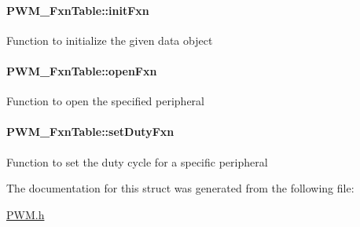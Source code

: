 \paragraph[{init\+Fxn}]{ P\+W\+M\+\_\+\+Fxn\+Table\+::init\+Fxn}\label{struct_p_w_m___fxn_table_aebcde91c512c962f100d13f511789254}
Function to initialize the given data object 
\paragraph[{open\+Fxn}]{ P\+W\+M\+\_\+\+Fxn\+Table\+::open\+Fxn}\label{struct_p_w_m___fxn_table_aca1bd99df949b2e0121ff90598279441}
Function to open the specified peripheral 
\paragraph[{set\+Duty\+Fxn}]{ P\+W\+M\+\_\+\+Fxn\+Table\+::set\+Duty\+Fxn}\label{struct_p_w_m___fxn_table_a766700e0a02097f9fd2d332b71082605}
Function to set the duty cycle for a specific peripheral 

The documentation for this struct was generated from the following file\+:\begin{DoxyCompactItemize}
\item 
\hyperlink{_p_w_m_8h}{P\+W\+M.\+h}\end{DoxyCompactItemize}
